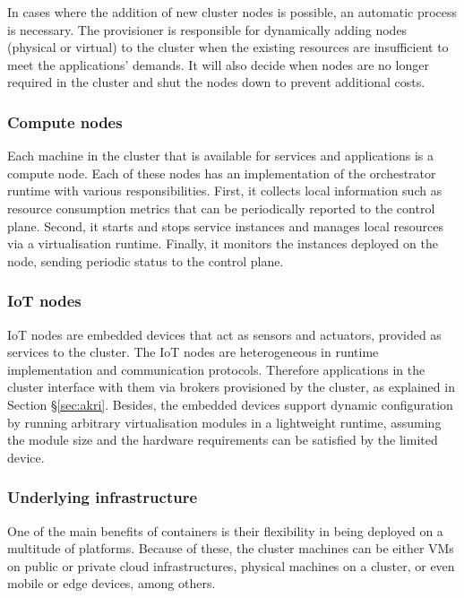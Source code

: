 In cases where the addition of new cluster nodes is possible, an automatic process is necessary. The provisioner is responsible for dynamically adding nodes (physical or virtual) to the cluster when the existing resources are insufficient to meet the applications' demands. It will also decide when nodes are no longer required in the cluster and shut the nodes down to prevent additional costs.

\subsubsection{Compute nodes}

Each machine in the cluster that is available for services and applications is a compute node. Each of these nodes has an implementation of the orchestrator runtime with various responsibilities. First, it collects local information such as resource consumption metrics that can be periodically reported to the control plane. Second, it starts and stops service instances and manages local resources via a virtualisation runtime. Finally, it monitors the instances deployed on the node, sending periodic status to the control plane.

\subsubsection{IoT nodes}

IoT nodes are embedded devices that act as sensors and actuators, provided as services to the cluster. The IoT nodes are heterogeneous in runtime implementation and communication protocols. Therefore applications in the cluster interface with them via brokers provisioned by the cluster, as explained in Section §\ref{sec:akri}. Besides, the embedded devices support dynamic configuration by running arbitrary virtualisation modules in a lightweight runtime, assuming the module size and the hardware requirements can be satisfied by the limited device.

\subsubsection{Underlying infrastructure}

One of the main benefits of containers is their flexibility in being deployed on a multitude of platforms. Because of these, the cluster machines can be either VMs on public or private cloud infrastructures, physical machines on a cluster, or even mobile or edge devices, among others.


